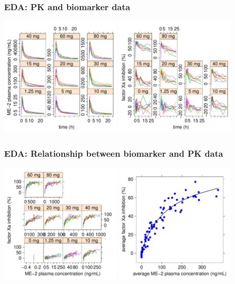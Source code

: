 \documentclass{beamer}
\begin{document}
\begin{frame}
  \frametitle{EDA: PK and biomarker data}

\vspace{-0.1in}  
\includegraphics[width=2.3in]{graphics/FXaPKBiomarkerPlots001.pdf}
\includegraphics[width=2.3in]{graphics/FXaPKBiomarkerPlots002.pdf}

\end{frame}

\begin{frame}
  \frametitle{EDA: Relationship between biomarker and PK data}
  
\vspace{-0.1in}  
\includegraphics[width=2.3in]{graphics/FXaPKBiomarkerPlots003.pdf}
\includegraphics[width=2.3in]{graphics/FXaPKBiomarkerPlots005.pdf}

\end{frame}
\end{document}
